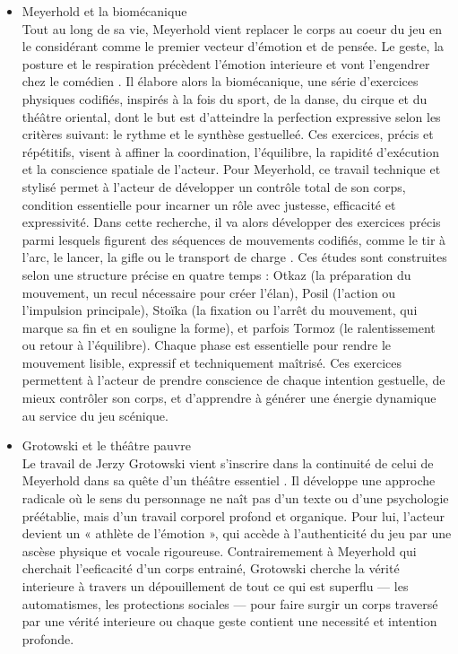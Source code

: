 \begin{itemize}
    \item Meyerhold et la biomécanique
    \\
    Tout au long de sa vie, Meyerhold vient replacer le corps au coeur du jeu en le considérant comme le premier vecteur d'émotion et de pensée. Le geste, 
    la posture et le respiration précèdent l'émotion interieure et vont l'engendrer chez le comédien \cite{PiconVallin}. Il élabore alors la biomécanique,
    une série d’exercices physiques codifiés, inspirés à la fois du sport, de la danse, du cirque et du théâtre oriental, dont le but
    est d'atteindre la perfection expressive selon les critères suivant: le rythme et le synthèse gestuelleé. 
    Ces exercices, précis et répétitifs, visent à affiner la coordination, l’équilibre, la rapidité d’exécution et la conscience spatiale de l’acteur.
    Pour Meyerhold, ce travail technique et stylisé permet à l’acteur de développer un contrôle total de son corps, condition essentielle pour incarner 
    un rôle avec justesse, efficacité et expressivité.
    Dans cette recherche, il va alors développer des exercices précis parmi lesquels figurent des séquences de mouvements codifiés, comme le tir à l’arc,
    le lancer, la gifle ou le transport de charge \cite{Baldwin}. Ces études sont construites selon une structure précise en quatre temps : Otkaz (la préparation du mouvement,
    un recul nécessaire pour créer l’élan), Posil (l’action ou l'impulsion principale), Stoïka (la fixation ou l’arrêt du mouvement, qui marque sa fin et en souligne la forme), 
    et parfois Tormoz (le ralentissement ou retour à l’équilibre). Chaque phase est essentielle pour rendre le mouvement lisible, expressif et techniquement maîtrisé.
    Ces exercices permettent à l’acteur de prendre conscience de chaque intention gestuelle, de mieux contrôler son corps, et d’apprendre à générer une énergie dynamique au service du jeu scénique.

    \item Grotowski et le théâtre pauvre
    \\ 
    Le travail de Jerzy Grotowski vient s'inscrire dans la continuité de celui de Meyerhold dans sa quête d’un théâtre essentiel \cite{grotowski}. 
    Il développe une approche radicale où le sens du personnage ne naît pas d’un texte ou d’une psychologie préétablie, mais d’un travail corporel 
    profond et organique. Pour lui, l’acteur devient un « athlète de l’émotion », qui accède à l’authenticité du jeu par une ascèse physique et vocale rigoureuse.
    Contrairemement à Meyerhold qui cherchait l'eeficacité d'un corps entrainé, Grotowski cherche la vérité interieure à travers un 
    dépouillement de tout ce qui est superflu --- les automatismes, les protections sociales --- pour faire surgir un corps traversé par une vérité interieure ou chaque 
    geste contient une necessité et intention profonde. 


\end{itemize}
